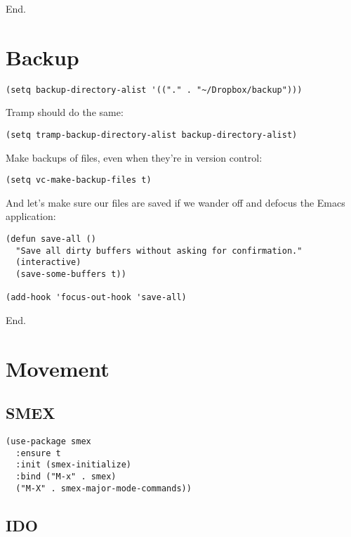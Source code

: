 \documentclass[12pt]{article}
\begin{document}
End. 

\section{Backup}
\label{sec-3}

\lstset{language=Lisp,label= ,caption= ,numbers=none}
\begin{lstlisting}
(setq backup-directory-alist '(("." . "~/Dropbox/backup")))
\end{lstlisting}

Tramp should do the same:
\lstset{language=Lisp,label= ,caption= ,numbers=none}
\begin{lstlisting}
(setq tramp-backup-directory-alist backup-directory-alist)
\end{lstlisting}
Make backups of files, even when they’re in version control:
\lstset{language=Lisp,label= ,caption= ,numbers=none}
\begin{lstlisting}
(setq vc-make-backup-files t)
\end{lstlisting}
And let’s make sure our files are saved if we wander off and defocus the Emacs application:
\lstset{language=Lisp,label= ,caption= ,numbers=none}
\begin{lstlisting}
(defun save-all ()
  "Save all dirty buffers without asking for confirmation."
  (interactive)
  (save-some-buffers t))

(add-hook 'focus-out-hook 'save-all)
\end{lstlisting}



End. 
\section{Movement}
\label{sec-4}
\subsection{SMEX}
\label{sec-4-1}

\lstset{language=Lisp,label= ,caption= ,numbers=none}
\begin{lstlisting}
(use-package smex
  :ensure t
  :init (smex-initialize)
  :bind ("M-x" . smex)
  ("M-X" . smex-major-mode-commands))
\end{lstlisting}

\subsection{IDO}
\label{sec-4-2}
\end{document}
